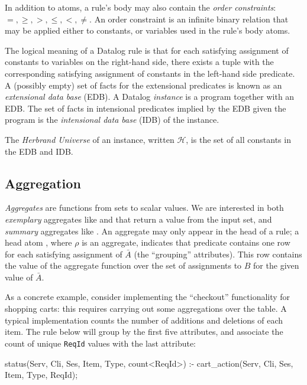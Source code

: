 In addition to atoms, a rule's body may also contain the {\em order
constraints}: $=, \geq, >, \leq, <, \neq$.  An order constraint is an infinite
binary relation that may be applied either to constants, or variables used in
the rule's body atoms.

The logical meaning of a Datalog rule is that for each satisfying assignment of
constants to variables on the right-hand side, there exists a tuple with the
corresponding satisfying assignment of constants in the left-hand side
predicate.
A (possibly empty) set of facts for the extensional predicates is known as an
{\em extensional data base} (EDB).  A Datalog {\em instance} is a program
together with an EDB.  The set of facts in intensional predicates implied by
the EDB given the program is the {\em intensional data base} (IDB) of the
instance.

The {\em Herbrand Universe} of an instance, written $\mathcal{H}$, is the set of
all constants in the EDB and IDB.

\subsection{Aggregation}

{\em Aggregates} are functions from sets to scalar values.
We are interested in both {\em exemplary} aggregates like  and  that return a value
from the input set, and {\em summary} aggregates like .  An aggregate may only appear in the head
of a rule; a head atom , where $\rho$ is an 
aggregate, indicates that predicate  contains one row for each 
satisfying assignment of $\bar{A}$ (the ``grouping'' attributes).  This row contains the value of the 
aggregate function over the set of assignments to $B$ for the given value of 
$\bar{A}$.

As a concrete example, consider implementing the ``checkout'' functionality for shopping carts: this requires carrying out some aggregations over the  table.
A typical implementation counts the number of additions and deletions 
of each item.  The rule below will group by the first five attributes, and associate the
count of unique {\tt ReqId} values with the last attribute: 

\noindent{}
\begin{Dedalus}

status(Serv, Cli, Ses, Item, Type, count<ReqId>) :- 
  cart\_action(Serv, Cli, Ses, Item, Type, ReqId);
\end{Dedalus}

